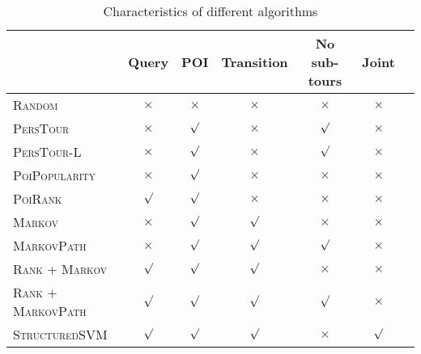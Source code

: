 \begin{table*}
\centering
\begin{tabular}{l|cccccc} \hline
                                    & Query    & POI      & Transition & No sub-tours & Joint    \\ \hline
\textsc{Random}                     & $\times$ & $\times$ & $\times$   & $\times$     & $\times$ \\ 
\textsc{PersTour}\cite{ijcai15}     & $\times$ & $\surd$  & $\times$   & $\surd$      & $\times$ \\
\textsc{PersTour-L}                 & $\times$ & $\surd$  & $\times$   & $\surd$      & $\times$ \\
\textsc{PoiPopularity}              & $\times$ & $\surd$  & $\times$   & $\times$     & $\times$ \\ 
\textsc{PoiRank}                    & $\surd$  & $\surd$  & $\times$   & $\times$     & $\times$ \\
\textsc{Markov}                     & $\times$ & $\surd$  & $\surd$    & $\times$     & $\times$ \\
\textsc{MarkovPath}                 & $\times$ & $\surd$  & $\surd$    & $\surd$      & $\times$ \\
\textsc{Rank} + \textsc{Markov}     & $\surd$  & $\surd$  & $\surd$    & $\times$     & $\times$ \\
\textsc{Rank} + \textsc{MarkovPath} & $\surd$  & $\surd$  & $\surd$    & $\surd$      & $\times$ \\
\textsc{StructuredSVM}              & $\surd$  & $\surd$  & $\surd$    & $\times$     & $\surd$  \\ \hline
\end{tabular}
\caption{Characteristics of different algorithms}
\label{table:character}
\end{table*}



